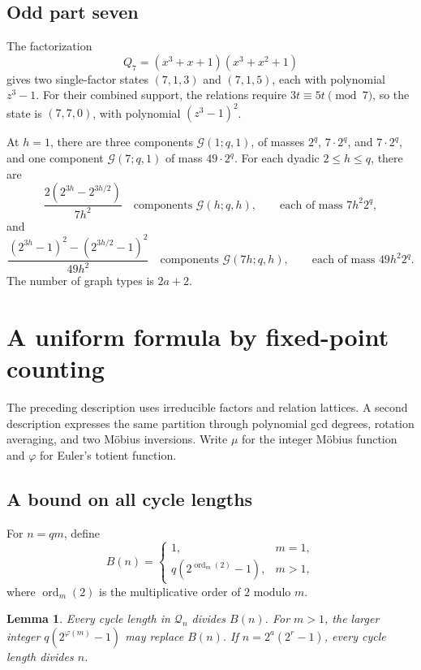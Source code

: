 \documentclass[11pt]{article}
\newtheorem{lemma}[theorem]{Lemma}
\theoremstyle{definition}
\theoremstyle{remark}
\numberwithin{equation}{section}
\newcommand{\G}{\mathcal G}
\newcommand{\Q}{\mathcal Q}
\DeclareMathOperator{\ord}{ord}
\begin{document}
\subsection{Odd part seven}

The factorization
\[
 Q_7=(x^3+x+1)(x^3+x^2+1)
\]
gives two single-factor states $(7,1,3)$ and $(7,1,5)$, each with
polynomial $z^3-1$. For their combined support, the relations require
$3t\equiv5t\pmod7$, so the state is $(7,7,0)$, with polynomial
$(z^3-1)^2$.

At $h=1$, there are three components $\G(1;q,1)$, of masses
$2^q$, $7\cdot2^q$, and $7\cdot2^q$, and one component
$\G(7;q,1)$ of mass $49\cdot2^q$. For each dyadic $2\le h\le q$,
there are
\begin{equation}\label{eq:seven-first}
 \frac{2(2^{3h}-2^{3h/2})}{7h^2}
 \quad\text{components }\G(h;q,h),
 \qquad\text{each of mass }7h^2 2^q,
\end{equation}
and
\begin{equation}\label{eq:seven-second}
 \frac{(2^{3h}-1)^2-(2^{3h/2}-1)^2}{49h^2}
 \quad\text{components }\G(7h;q,h),
 \qquad\text{each of mass }49h^2 2^q.
\end{equation}
The number of graph types is $2a+2$.

\section{A uniform formula by fixed-point counting}\label{sec:mobius}

The preceding description uses irreducible factors and relation lattices.
A second description expresses the same partition through polynomial gcd
degrees, rotation averaging, and two M\"obius inversions. Write $\mu$ for
the integer M\"obius function and $\varphi$ for Euler's totient function.

\subsection{A bound on all cycle lengths}

For $n=qm$, define
\begin{equation}\label{eq:period-bound}
 B(n)=
 \begin{cases}
 1,&m=1,\\
 q(2^{\ord_m(2)}-1),&m>1,
 \end{cases}
\end{equation}
where $\ord_m(2)$ is the multiplicative order of $2$ modulo $m$.

\begin{lemma}\label{lem:period-bound}
Every cycle length in $\Q_n$ divides $B(n)$. For $m>1$, the larger
integer $q(2^{\varphi(m)}-1)$ may replace $B(n)$. If
$n=2^a(2^r-1)$, every cycle length divides $n$.
\end{lemma}
\end{document}
